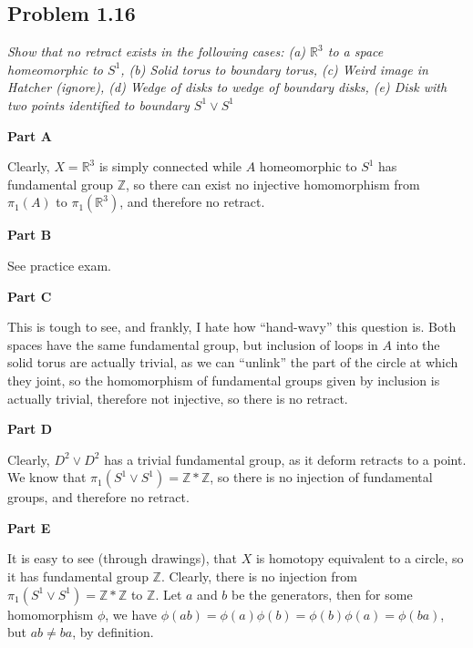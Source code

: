 \documentclass[10pt, oneside]{amsart}
\begin{document}
    \subsection{Problem 1.16}

    \textit{Show that no retract exists in the following cases: (a) $\mathbb{R}^3$ to a space homeomorphic to $S^1$, (b) Solid torus to boundary torus, (c) Weird image in Hatcher (ignore), (d) Wedge of disks to wedge of boundary disks, (e)
      Disk with two points identified to boundary $S^1 \vee S^1$}
    \newline

    \textbf{Part A}
    \newline

    Clearly, $X = \mathbb{R}^3$ is simply connected while $A$ homeomorphic to $S^1$ has fundamental group $\mathbb{Z}$, so there can exist no injective homomorphism from $\pi_1(A)$ to $\pi_1(\mathbb{R}^3)$, and therefore no retract.
    \newline

    \textbf{Part B}
    \newline

    See practice exam.
    \newline

    \textbf{Part C}
    \newline

    This is tough to see, and frankly, I hate how ``hand-wavy'' this question is.
    Both spaces have the same fundamental group, but inclusion of loops in $A$ into the solid torus are actually trivial, as we can ``unlink'' the part of the circle at which they joint, so the
    homomorphism of fundamental groups given by inclusion is actually trivial, therefore not injective, so there is no retract.
    \newline

    \textbf{Part D}
    \newline

    Clearly, $D^2 \vee D^2$ has a trivial fundamental group, as it deform retracts to a point. We know that $\pi_1(S^1 \vee S^1) = \mathbb{Z} * \mathbb{Z}$, so there is no injection
    of fundamental groups, and therefore no retract.
    \newline

    \textbf{Part E}
    \newline

    It is easy to see (through drawings), that $X$ is homotopy equivalent to a circle, so it has fundamental group $\mathbb{Z}$. Clearly, there is no injection from $\pi_1(S^1 \vee S^1) = \mathbb{Z} * \mathbb{Z}$ to $\mathbb{Z}$.
    Let $a$ and $b$ be the generators, then for some homomorphism $\phi$, we have $\phi(ab) = \phi(a) \phi(b) = \phi(b) \phi(a) = \phi(ba)$, but $ab \neq ba$, by definition.
\end{document}
